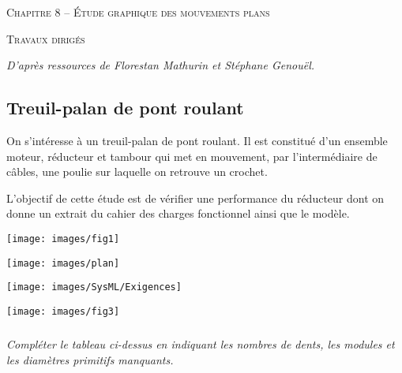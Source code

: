 \documentclass[10pt]{article}
\begin{document}

\begin{center}
\large{\textsc{Chapitre 8 --  Étude graphique des mouvements plans}}
\end{center}

\begin{center}
\textsc{Travaux dirigés}
\end{center}

\normalsize

\begin{flushright}
\textit{D'après ressources de Florestan Mathurin et Stéphane Genouël.}
\end{flushright}

 \renewcommand{\baselinestretch}{1.2}


\subsection*{Treuil-palan de pont roulant}
\begin{minipage}[c]{.45\linewidth}
On s'intéresse à un treuil-palan de pont roulant. Il est constitué d'un ensemble moteur, réducteur et tambour qui met en mouvement, par l'intermédiaire de câbles, une poulie sur laquelle on retrouve un crochet.

L'objectif de cette étude est de vérifier une performance du réducteur dont on donne un extrait du cahier des charges fonctionnel ainsi que le modèle. 
\end{minipage}\hfill
\begin{minipage}[c]{.45\linewidth}
\begin{center}
\texttt{[image: images/fig1]}
\end{center}
\end{minipage}

\vspace{.5cm}

\begin{center}
\texttt{[image: images/plan]}
\end{center}

\begin{center}
\texttt{[image: images/SysML/Exigences]}
\end{center}
\begin{center}
\texttt{[image: images/fig3]}
\end{center}
\subparagraph{}
\textit{Compléter le tableau ci-dessus en indiquant les nombres de dents, les modules et les diamètres primitifs manquants.}
\end{document}
